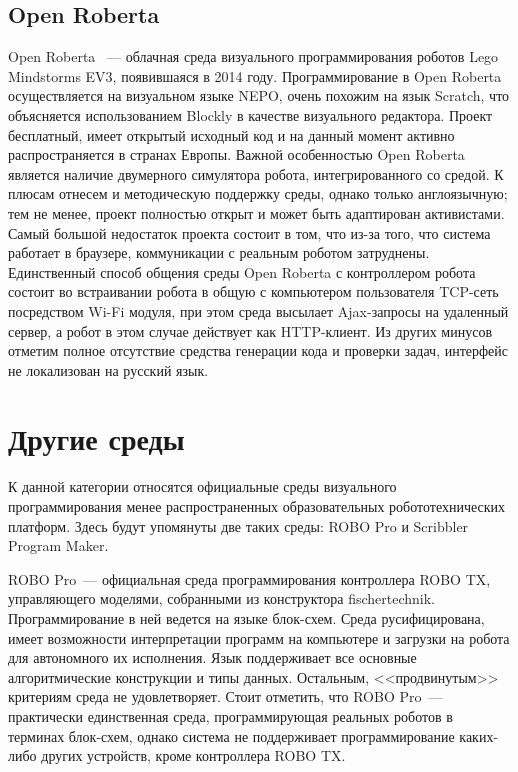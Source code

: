 \documentclass[a5paper]{article}
\begin{document}
\subsection{Open Roberta}

Open Roberta~\cite{jost2014graphical} --- облачная среда визуального программирования роботов Lego Mindstorms EV3, появившаяся в 2014 году. 
Программирование в Open Roberta осуществляется на визуальном языке NEPO, очень похожим на язык Scratch, что объясняется использованием Blockly в качестве визуального редактора. Проект бесплатный, имеет открытый исходный код и на данный момент активно распространяется в странах Европы. Важной особенностью Open Roberta является наличие двумерного симулятора робота, интегрированного со средой. К плюсам отнесем и методическую поддержку среды, однако только англоязычную; тем не менее, проект полностью открыт и может быть адаптирован активистами. Самый большой недостаток проекта состоит в том, что из-за того, что система работает в браузере, коммуникации с реальным роботом затруднены. Единственный способ общения среды Open Roberta с контроллером робота состоит во встраивании робота в общую с компьютером пользователя TCP-сеть посредством Wi-Fi модуля, при этом среда высылает Ajax-запросы на удаленный сервер, а робот в этом случае действует как HTTP-клиент. Из других минусов отметим полное отсутствие средства генерации кода и проверки задач, интерфейс не локализован на русский язык. 

\section{Другие среды}

К данной категории относятся официальные среды визуального программирования менее распространенных образовательных 
робототехнических платформ. Здесь будут упомянуты две таких среды: ROBO Pro и Scribbler Program Maker.

ROBO Pro~--- официальная среда программирования контроллера ROBO TX, управляющего моделями, собранными из 
конструктора fischertechnik. Программирование в ней ведется на языке блок-схем. Среда русифицирована, имеет 
возможности интерпретации программ на компьютере и загрузки на робота для автономного их исполнения. Язык поддерживает 
все основные алгоритмические конструкции и типы данных. Остальным, <<продвинутым>> критериям среда не удовлетворяет. 
Стоит отметить, что ROBO Pro~--- практически единственная среда, программирующая реальных роботов в терминах 
блок-схем, однако система не поддерживает программирование каких-либо других устройств, кроме контроллера ROBO TX.
\end{document}
